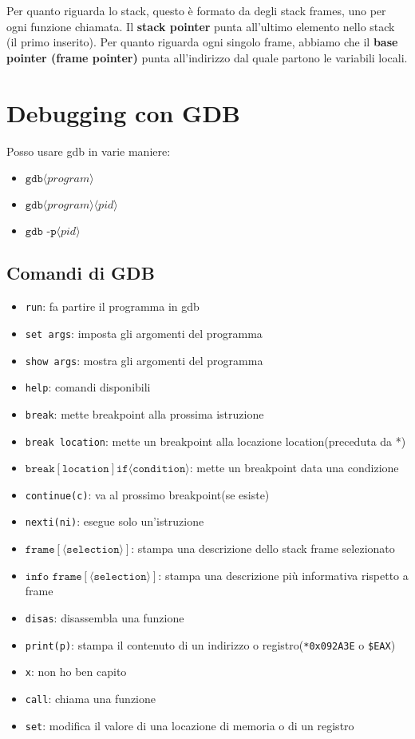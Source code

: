 Per quanto riguarda lo stack, questo è formato da degli stack frames, uno per ogni funzione chiamata. Il \textbf{stack pointer} punta all'ultimo elemento nello stack (il primo inserito). Per quanto riguarda ogni singolo frame, abbiamo che il \textbf{base pointer (frame pointer)} punta all'indirizzo dal quale partono le variabili locali.

\section{Debugging con GDB}
Posso usare gdb in varie maniere:
\begin{itemize}
\item $\texttt{gdb} \langle program \rangle$
\item $\texttt{gdb} \langle program \rangle \langle pid \rangle $
\item $\texttt{gdb -p} \langle pid \rangle$
\end{itemize}

\subsection{Comandi di GDB}
\begin{itemize}
\item \texttt{run}: fa partire il programma in gdb
\item \texttt{set args}: imposta gli argomenti del programma
\item \texttt{show args}: mostra gli argomenti del programma
\item \texttt{help}: comandi disponibili
\item \texttt{break}: mette breakpoint alla prossima istruzione
\item \texttt{break location}: mette un breakpoint alla locazione location(preceduta da *)
\item $\texttt{break} [\texttt{location}] \texttt{if}
\langle \texttt{condition} \rangle$: mette un breakpoint data una condizione
\item \texttt{continue(c)}: va al prossimo breakpoint(se esiste)
\item \texttt{nexti(ni)}: esegue solo un'istruzione
\item $\texttt{frame} [\langle \texttt{selection} \rangle]$:
stampa una descrizione dello stack frame selezionato
\item $\texttt{info frame} [\langle \texttt{selection} \rangle]$:
stampa una descrizione più informativa rispetto a frame
\item \texttt{disas}: disassembla una funzione
\item \texttt{print(p)}: stampa il contenuto di un indirizzo o
registro(\texttt{*0x092A3E} o \texttt{\$EAX})  
\item \texttt{x}: non ho ben capito
\item \texttt{call}: chiama una funzione 
\item \texttt{set}: modifica il valore di una locazione di memoria o di un registro

\end{itemize}